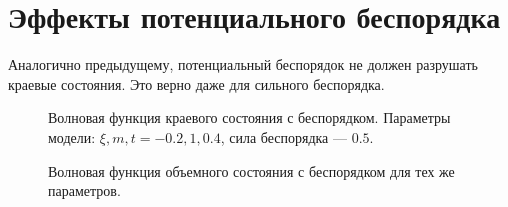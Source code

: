 \documentclass{article}
\begin{document}
    \section{Эффекты потенциального беспорядка}
    Аналогично предыдущему, потенциальный беспорядок не должен разрушать краевые состояния.
    Это верно даже для сильного беспорядка.
    \begin{figure}[h]
        \centering
        \begin{minipage}[h]{0.4\linewidth}
            \caption{
                Волновая функция краевого состояния с беспорядком.
                Параметры модели: $\xi, m, t = -0.2, 1, 0.4$, сила беспорядка --- $0.5$.
                }
        \end{minipage}
        \hfill
        \begin{minipage}[h]{0.4\linewidth}
            \caption{
                Волновая функция объемного состояния с беспорядком для тех же параметров.
                }
        \end{minipage}
    \end{figure}
\end{document}
